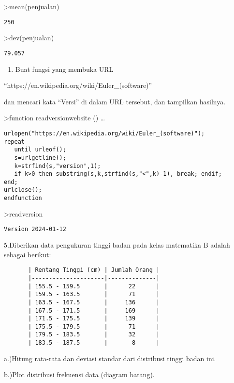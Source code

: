\documentclass[
]{book}
\providecommand{\tightlist}{%
  \setlength{\itemsep}{0pt}\setlength{\parskip}{0pt}}
\begin{document}
\textgreater mean(penjualan)

\begin{verbatim}
250
\end{verbatim}

\textgreater dev(penjualan)

\begin{verbatim}
79.057
\end{verbatim}

\begin{enumerate}
\def\labelenumi{\arabic{enumi}.}
\setcounter{enumi}{3}
\tightlist
\item
  Buat fungsi yang membuka URL
\end{enumerate}

``https://en.wikipedia.org/wiki/Euler\_(software)''

dan mencari kata ``Versi'' di dalam URL tersebut, dan tampilkan hasilnya.

\textgreater function readversionwebsite () \ldots{}

\begin{verbatim}
urlopen("https://en.wikipedia.org/wiki/Euler_(software)");
repeat
   until urleof();
   s=urlgetline();
   k=strfind(s,"version",1);
   if k>0 then substring(s,k,strfind(s,"<",k)-1), break; endif;
end;
urlclose();
endfunction
\end{verbatim}

\textgreater readversion

\begin{verbatim}
Version 2024-01-12
\end{verbatim}

5.Diberikan data pengukuran tinggi badan pada kelas matematika B adalah sebagai berikut:

\begin{verbatim}
       | Rentang Tinggi (cm) | Jumlah Orang |  
       |---------------------|--------------|  
       | 155.5 - 159.5       |      22      |  
       | 159.5 - 163.5       |      71      |  
       | 163.5 - 167.5       |     136      |  
       | 167.5 - 171.5       |     169      |  
       | 171.5 - 175.5       |     139      |  
       | 175.5 - 179.5       |      71      |  
       | 179.5 - 183.5       |      32      |  
       | 183.5 - 187.5       |       8      |  
\end{verbatim}

a.)Hitung rata-rata dan deviasi standar dari distribusi tinggi badan ini.

b.)Plot distribusi frekuensi data (diagram batang).
\end{document}
